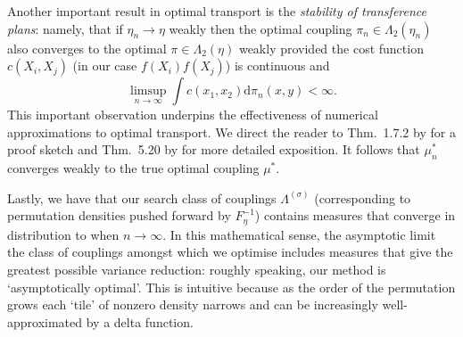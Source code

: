 
 Another important result in optimal transport is the \emph{stability of transference plans}: namely, that if $\eta_n \to \eta$ weakly then the optimal coupling $\pi_n \in \Lambda_2(\eta_n)$ also converges to the optimal $\pi \in \Lambda_2(\eta)$ weakly provided the cost function $c(X_i,X_j)$ (in our case $f(X_i)f(X_j)$) is continuous and 
\begin{equation}
    \limsup_{n \to \infty} \int c(x_1,x_2) \textrm{d}\pi_n(x,y) < \infty.
\end{equation}
This important observation underpins the effectiveness of numerical approximations to optimal transport. We direct the reader to Thm.~1.7.2 by \citet{panaretos2020invitation} for a proof sketch and Thm.~5.20 by \citet{villani2009optimal} for more detailed exposition. It follows that $\mu_n^{*}$ converges weakly to the true optimal coupling $\mu^*$.

Lastly, we have that our search class of couplings $\Lambda^{(\sigma)}$ (corresponding to permutation densities pushed forward by $F_\eta^{-1}$) contains measures that converge in distribution to  when $n \to \infty$. 
In this mathematical sense, the asymptotic limit the class of couplings amongst which we optimise includes measures that give the greatest possible variance reduction: roughly speaking, our method is `asymptotically optimal'.
This is intuitive because as the order of the permutation grows each `tile' of nonzero density narrows and can be increasingly well-approximated by a delta function. 


